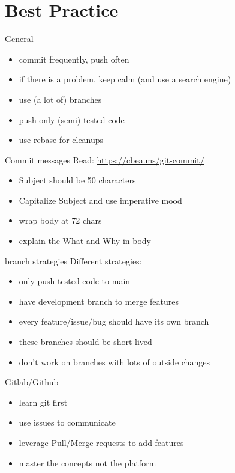 \section{Best Practice}
\begin{frame}{General}
	\begin{itemize}
		\item commit frequently, push often
		\item if there is a problem, keep calm (and use a search engine)
		\item use (a lot of) branches
		\item push only (semi) tested code
		\item use rebase for cleanups 
	\end{itemize}
\end{frame}
\begin{frame}{Commit messages}
	Read:  \url{https://cbea.ms/git-commit/}
	\begin{itemize}
		\item Subject should be 50 characters
		\item Capitalize Subject and use imperative mood
		\item wrap body at 72 chars
		\item explain the What and Why in body
	\end{itemize}
\end{frame}
\begin{frame}{branch strategies}
	Different strategies:
	\begin{itemize}
		\item only push tested code to main
		\item have development branch to merge features
		\item every feature/issue/bug should have its own branch
		\item these branches should be short lived
		\item don't work on branches with lots of outside changes
	\end{itemize}
\end{frame}
\begin{frame}{Gitlab/Github}
	\begin{itemize}
		\item learn git first
		\item use issues to communicate
		\item leverage Pull/Merge requests to add features
		\item master the concepts not the platform
	\end{itemize}
\end{frame}
